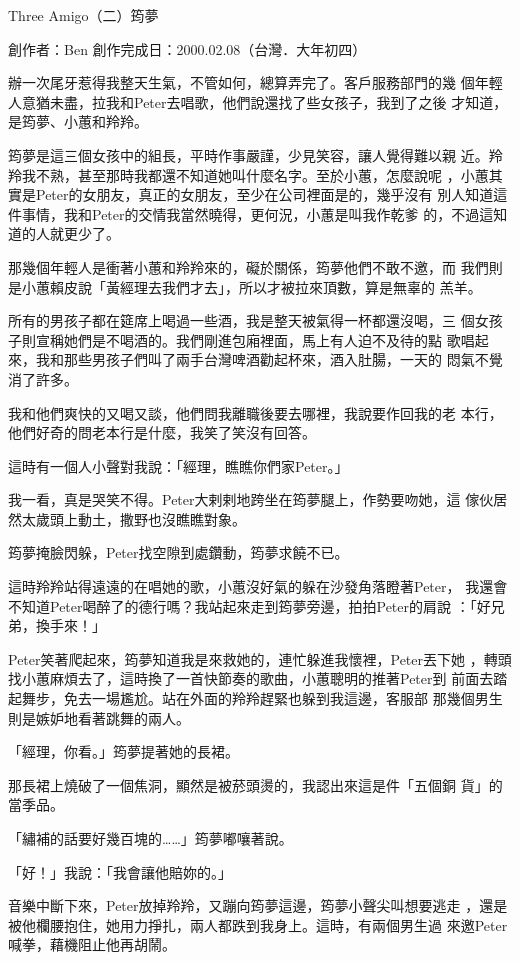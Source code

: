 



Three Amigo（二）筠夢

創作者：Ben
創作完成日：2000.02.08（台灣．大年初四）


辦一次尾牙惹得我整天生氣，不管如何，總算弄完了。客戶服務部門的幾
個年輕人意猶未盡，拉我和Peter去唱歌，他們說還找了些女孩子，我到了之後
才知道，是筠夢、小蕙和羚羚。

筠夢是這三個女孩中的組長，平時作事嚴謹，少見笑容，讓人覺得難以親
近。羚羚我不熟，甚至那時我都還不知道她叫什麼名字。至於小蕙，怎麼說呢
，小蕙其實是Peter的女朋友，真正的女朋友，至少在公司裡面是的，幾乎沒有
別人知道這件事情，我和Peter的交情我當然曉得，更何況，小蕙是叫我作乾爹
的，不過這知道的人就更少了。

那幾個年輕人是衝著小蕙和羚羚來的，礙於關係，筠夢他們不敢不邀，而
我們則是小蕙賴皮說「黃經理去我們才去」，所以才被拉來頂數，算是無辜的
羔羊。

所有的男孩子都在筵席上喝過一些酒，我是整天被氣得一杯都還沒喝，三
個女孩子則宣稱她們是不喝酒的。我們剛進包廂裡面，馬上有人迫不及待的點
歌唱起來，我和那些男孩子們叫了兩手台灣啤酒勸起杯來，酒入肚腸，一天的
悶氣不覺消了許多。

我和他們爽快的又喝又談，他們問我離職後要去哪裡，我說要作回我的老
本行，他們好奇的問老本行是什麼，我笑了笑沒有回答。

這時有一個人小聲對我說：「經理，瞧瞧你們家Peter。」

我一看，真是哭笑不得。Peter大剌剌地跨坐在筠夢腿上，作勢要吻她，這
傢伙居然太歲頭上動土，撒野也沒瞧瞧對象。

筠夢掩臉閃躲，Peter找空隙到處鑽動，筠夢求饒不已。

這時羚羚站得遠遠的在唱她的歌，小蕙沒好氣的躲在沙發角落瞪著Peter，
我還會不知道Peter喝醉了的德行嗎？我站起來走到筠夢旁邊，拍拍Peter的肩說
：「好兄弟，換手來！」

Peter笑著爬起來，筠夢知道我是來救她的，連忙躲進我懷裡，Peter丟下她
，轉頭找小蕙麻煩去了，這時換了一首快節奏的歌曲，小蕙聰明的推著Peter到
前面去踏起舞步，免去一場尷尬。站在外面的羚羚趕緊也躲到我這邊，客服部
那幾個男生則是嫉妒地看著跳舞的兩人。

「經理，你看。」筠夢提著她的長裙。

那長裙上燒破了一個焦洞，顯然是被菸頭燙的，我認出來這是件「五個銅
貨」的當季品。

「繡補的話要好幾百塊的……」筠夢嘟嚷著說。

「好！」我說：「我會讓他賠妳的。」

音樂中斷下來，Peter放掉羚羚，又蹦向筠夢這邊，筠夢小聲尖叫想要逃走
，還是被他欄腰抱住，她用力掙扎，兩人都跌到我身上。這時，有兩個男生過
來邀Peter喊拳，藉機阻止他再胡鬧。

